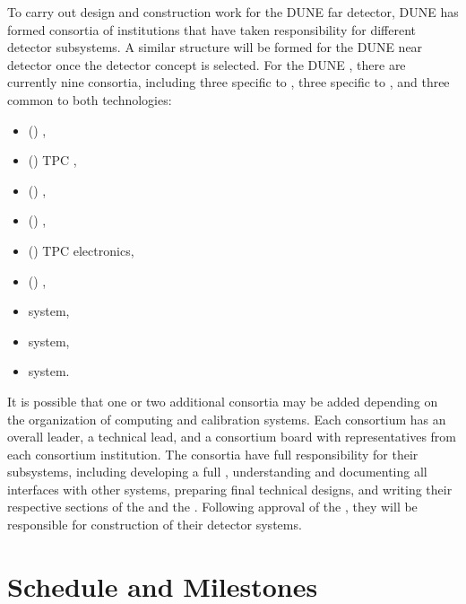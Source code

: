 To carry out design and construction work for the DUNE far detector, DUNE has  formed consortia of institutions that have taken responsibility for different detector subsystems. A similar structure will be formed for the DUNE near detector once the detector concept is selected. For the DUNE , there are currently nine consortia, including three specific to \single, three specific to \dual, and three common to both technologies:
\begin{itemize}
\item (\single) , %
\item (\single) TPC , %
\item (\single) , %
\item (\dual) , %
\item (\dual) TPC electronics, %
\item (\dual) , %
\item {} system, %
\item {} system, %
\item {} system. %
\end{itemize}
It is possible that one or two additional consortia may be added depending on the organization of computing and calibration systems. Each consortium has an overall leader, a technical lead, and a consortium board with representatives from each consortium institution. The consortia have full responsibility for their subsystems, including developing a full , understanding and documenting all interfaces with other systems, preparing final technical designs, and writing their respective sections of the  and the . Following approval of the  , they will be responsible for construction of their detector systems. %


\section{Schedule and Milestones} 

